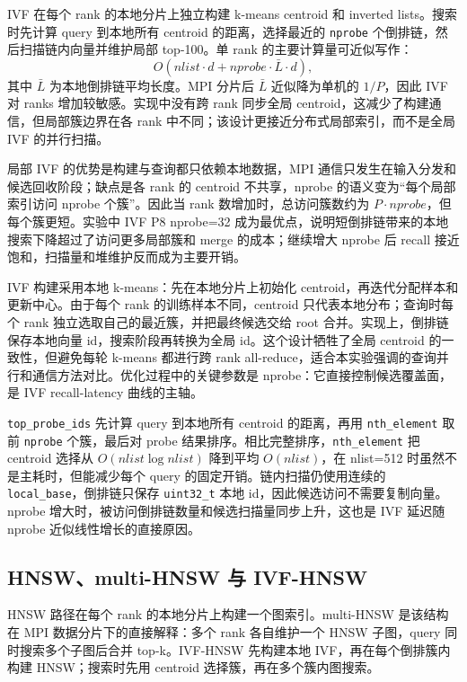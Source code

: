 \documentclass[11pt,a4paper]{article}
\begin{document}
IVF 在每个 rank 的本地分片上独立构建 k-means centroid 和 inverted lists。搜索时先计算 query 到本地所有 centroid 的距离，选择最近的 \texttt{nprobe} 个倒排链，然后扫描链内向量并维护局部 top-100。单 rank 的主要计算量可近似写作：
\begin{equation}
O(nlist\cdot d+nprobe\cdot \bar{L}\cdot d),
\end{equation}
其中 $\bar{L}$ 为本地倒排链平均长度。MPI 分片后 $\bar{L}$ 近似降为单机的 $1/P$，因此 IVF 对 ranks 增加较敏感。实现中没有跨 rank 同步全局 centroid，这减少了构建通信，但局部簇边界在各 rank 中不同；该设计更接近分布式局部索引，而不是全局 IVF 的并行扫描。

局部 IVF 的优势是构建与查询都只依赖本地数据，MPI 通信只发生在输入分发和候选回收阶段；缺点是各 rank 的 centroid 不共享，nprobe 的语义变为“每个局部索引访问 nprobe 个簇”。因此当 rank 数增加时，总访问簇数约为 $P\cdot nprobe$，但每个簇更短。实验中 IVF P8 nprobe=32 成为最优点，说明短倒排链带来的本地搜索下降超过了访问更多局部簇和 merge 的成本；继续增大 nprobe 后 recall 接近饱和，扫描量和堆维护反而成为主要开销。

IVF 构建采用本地 k-means：先在本地分片上初始化 centroid，再迭代分配样本和更新中心。由于每个 rank 的训练样本不同，centroid 只代表本地分布；查询时每个 rank 独立选取自己的最近簇，并把最终候选交给 root 合并。实现上，倒排链保存本地向量 id，搜索阶段再转换为全局 id。这个设计牺牲了全局 centroid 的一致性，但避免每轮 k-means 都进行跨 rank all-reduce，适合本实验强调的查询并行和通信方法对比。优化过程中的关键参数是 nprobe：它直接控制候选覆盖面，是 IVF recall-latency 曲线的主轴。

\texttt{top\_probe\_ids} 先计算 query 到本地所有 centroid 的距离，再用 \texttt{nth\_element} 取前 \texttt{nprobe} 个簇，最后对 probe 结果排序。相比完整排序，\texttt{nth\_element} 把 centroid 选择从 $O(nlist\log nlist)$ 降到平均 $O(nlist)$，在 nlist=512 时虽然不是主耗时，但能减少每个 query 的固定开销。链内扫描仍使用连续的 \texttt{local\_base}，倒排链只保存 \texttt{uint32\_t} 本地 id，因此候选访问不需要复制向量。nprobe 增大时，被访问倒排链数量和候选扫描量同步上升，这也是 IVF 延迟随 nprobe 近似线性增长的直接原因。

\subsection{HNSW、multi-HNSW 与 IVF-HNSW}

HNSW 路径在每个 rank 的本地分片上构建一个图索引。multi-HNSW 是该结构在 MPI 数据分片下的直接解释：多个 rank 各自维护一个 HNSW 子图，query 同时搜索多个子图后合并 top-k。IVF-HNSW 先构建本地 IVF，再在每个倒排簇内构建 HNSW；搜索时先用 centroid 选择簇，再在多个簇内图搜索。
\end{document}
